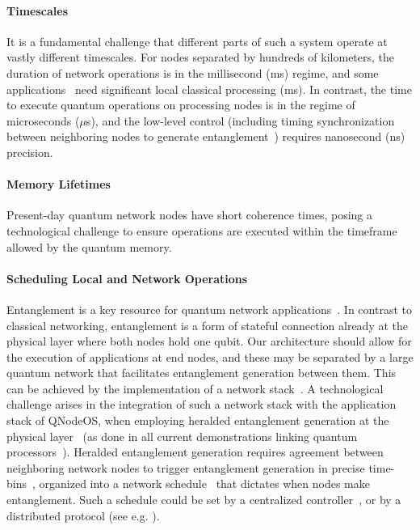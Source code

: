 \paragraph{Timescales}
It is a fundamental challenge that different parts of such a system operate at vastly different timescales.
For nodes separated by hundreds of kilometers, the duration of network operations is in the millisecond (ms) regime, and some applications~\cite{wehner_2018_stages} need  significant local classical processing (ms).
In contrast, the time to execute quantum operations on processing nodes is in the regime of microseconds ($\mu$s), and the low-level control (including timing synchronization between neighboring nodes to generate entanglement~\cite{humphreys_2018_delivery}) requires nanosecond (ns) precision.

\paragraph{Memory Lifetimes}
Present-day quantum network nodes have short coherence times, posing a technological challenge to ensure operations are executed within the timeframe allowed by the quantum memory.

\paragraph{Scheduling Local and Network Operations}
Entanglement is a key resource for quantum network applications~\cite{wehner_2018_stages}.
In contrast to classical networking, entanglement is a form of stateful connection already at the physical layer where both nodes hold one qubit.
Our architecture should allow for the execution of applications at end nodes, and these may be separated by a large quantum network that facilitates entanglement generation between them.
This can be achieved by the implementation of a network stack~\cite{dahlberg_2019_egp,kozlowski_2020_qnp}.
A technological challenge arises in the integration of such a network stack with the application stack of QNodeOS, when employing heralded entanglement generation at the physical layer~\cite{dahlberg_2019_egp} (as done in all current demonstrations linking quantum processors~\cite{stolk2024metropolitan,pompili_2022_experimental}). 
Heralded entanglement generation requires agreement between neighboring network nodes to trigger entanglement generation in precise time-bins~\cite{dahlberg_2019_egp}, organized into a network schedule~\cite{skrzypczyk_2021_arch} that dictates when nodes make entanglement.
Such a schedule could be set by a centralized controller~\cite{skrzypczyk_2021_arch}, or by a distributed protocol (see e.g. \cite{dahlberg_2019_egp}).

